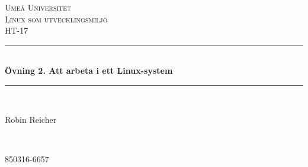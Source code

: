 \documentclass[11pt]{article}
\begin{document}

\begin{titlepage} %
	\newcommand{\HRule}{\rule{\linewidth}{0.5mm}} %

	\center %


	\textsc{\LARGE Umeå Universitet}\\[1.5cm] %

	\textsc{\Large Linux som utvecklingsmiljö}\\[0.5cm] %

	\textsc{\large HT-17}\\[0.5cm] %


	\HRule\\[0.4cm]

	{\huge\bfseries Övning 2. Att arbeta i ett Linux-system}\\[0.4cm] %

	\HRule\\[1.5cm]


	\begin{minipage}{0.4\textwidth}
		\begin{flushleft}
			\large
			Robin Reicher
		\end{flushleft}
	\end{minipage}
	~
	\begin{minipage}{0.4\textwidth}
		\begin{flushright}
			\large
			850316-6657
		\end{flushright}
	\end{minipage}



\end{titlepage}
\end{document}
